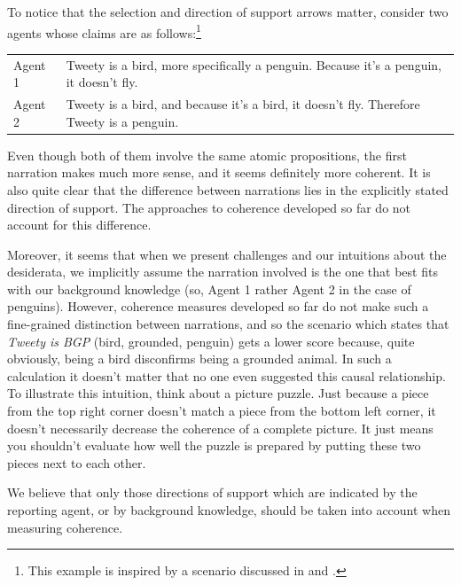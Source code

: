 \documentclass[10pt,]{scrartcl}
\begin{document}
To notice that the selection and direction of support arrows matter, 
consider two agents whose claims are as follows:\footnote{This example is inspired by a scenario discussed in \citep[50]{bovens2004bayesian} and \citep{Meijs2007Alleged}.}

\vspace{2mm}

\begin{center}
\begin{tabular}{lp{9cm}}
\textsf{Agent 1}     & Tweety is a bird, more specifically a penguin. Because it’s a penguin, it doesn’t fly.  \\
\textsf{Agent 2}     &  Tweety is a bird, and because it’s a bird, it doesn't fly. Therefore Tweety is a penguin. \\
\end{tabular}
\end{center}

\vspace{2mm}

\noindent Even though both of them involve the same atomic propositions,
the first narration makes much more sense, and it seems definitely more
coherent. It is also quite clear that the difference between narrations
lies in the explicitly stated direction of support. The approaches to
coherence developed so far do not account for this difference.

Moreover, it seems that when we present challenges and our intuitions
about the desiderata, we implicitly assume the narration involved is the
one that best fits with our background knowledge (so, Agent 1 rather
Agent 2 in the case of penguins). However, coherence measures developed
so far do not make such a fine-grained distinction between narrations,
and so the scenario which states that \textit{Tweety is BGP} (bird,
grounded, penguin) gets a lower score because, quite obviously, being a
bird disconfirms being a grounded animal. In such a calculation it
doesn't matter that no one even suggested this causal relationship. To
illustrate this intuition, think about a picture puzzle. Just because a
piece from the top right corner doesn't match a piece from the bottom
left corner, it doesn't necessarily decrease the coherence of a complete
picture. It just means you shouldn't evaluate how well the puzzle is
prepared by putting these two pieces next to each other.

We believe that only those directions of support which are indicated by
the reporting agent, or by background knowledge, should be taken into
account when measuring coherence.
\end{document}
